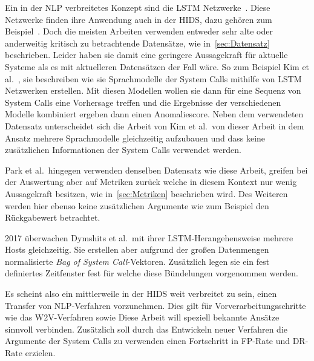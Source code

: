         Ein in der \ac{NLP} verbreitetes Konzept sind die \ac{LSTM} Netzwerke~\cite{LSTMNLP2016,LSTMREVIEWYU2019}.
        Diese Netzwerke finden ihre Anwendung auch in der \ac{HIDS}, dazu gehören zum Beispiel~\cite{LSTMsys, LSTMPARK2021, LSTMSURATKAR2019, NIU2020, BIDIRECTIONALLSTMCHAWLA2019, VARIATIONALLSTMBOUZAR2019}.
        Doch die meisten Arbeiten verwenden entweder sehr alte oder anderweitig kritisch zu betrachtende Datensätze, wie in~\autoref{sec:Datensatz} beschrieben.
        Leider haben sie damit eine geringere Aussagekraft für aktuelle Systeme als es mit aktuelleren Datensätzen der Fall wäre.
        So zum Beispiel Kim et al.~\cite{LSTMsys}, sie beschreiben wie sie Sprachmodelle der System Calls mithilfe von \ac{LSTM} Netzwerken erstellen.
        Mit diesen Modellen wollen sie dann für eine Sequenz von System Calls eine Vorhersage treffen und die Ergebnisse der verschiedenen Modelle kombiniert ergeben dann einen Anomaliescore.
        Neben dem verwendeten Datensatz unterscheidet sich die Arbeit von Kim et al.\ von dieser Arbeit in dem Ansatz mehrere Sprachmodelle gleichzeitig aufzubauen und dass keine zusätzlichen Informationen der System Calls verwendet werden.

        Park et al.\ hingegen verwenden denselben Datensatz wie diese Arbeit, greifen bei der Auswertung aber auf Metriken zurück welche in diesem Kontext nur wenig Aussagekraft besitzen, wie in~\autoref{sec:Metriken} beschrieben wird.
        Des Weiteren werden hier ebenso keine zusätzlichen Argumente wie zum Beispiel den Rückgabewert betrachtet.~\cite{LSTMPARK2021}

        2017 überwachen Dymshits et al.\ mit ihrer LSTM-Herangehensweise mehrere Hosts gleichzeitig.
        Sie erstellen aber aufgrund der großen Datenmengen normalisierte \textit{Bag of System Call}-Vektoren.
        Zusätzlich legen sie ein fest definiertes Zeitfenster fest für welche diese Bündelungen vorgenommen werden.~\cite{LSTMDYMSHITS2017}

        Es scheint also ein mittlerweile in der \ac{HIDS} weit verbreitet zu sein, einen Transfer von \ac{NLP}-Verfahren vorzunehmen.
        Dies gilt für Vorverarbeitungsschritte wie das \ac{W2V}-Verfahren sowie 
        Diese Arbeit will speziell bekannte Ansätze sinnvoll verbinden.
        Zusätzlich soll durch das Entwickeln neuer Verfahren die Argumente der System Calls zu verwenden einen Fortschritt in \ac{FP}-Rate und \ac{DR}-Rate erzielen.





